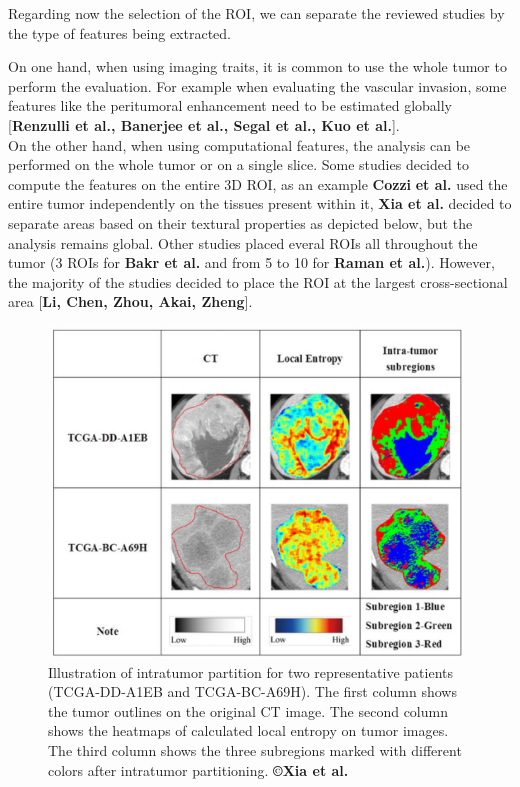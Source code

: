 \documentclass[]{article}
\begin{document}
Regarding now the selection of the ROI, we can separate the reviewed
studies by the type of features being extracted.

On one hand, when using imaging traits, it is common to use the whole
tumor to perform the evaluation. For example when evaluating the
vascular invasion, some features like the peritumoral enhancement need
to be estimated globally {[}\textbf{Renzulli et al., Banerjee et al.,
Segal et al., Kuo et al.}{]}.\\
On the other hand, when using computational features, the analysis can
be performed on the whole tumor or on a single slice. Some studies
decided to compute the features on the entire 3D ROI, as an example
\textbf{Cozzi} \textbf{et al.} used the entire tumor independently on
the tissues present within it, \textbf{Xia et al.} decided to separate
areas based on their textural properties as depicted below, but the
analysis remains global. Other studies placed everal ROIs all throughout
the tumor (3 ROIs for \textbf{Bakr et al.} and from 5 to 10 for
\textbf{Raman et al.}). However, the majority of the studies decided to
place the ROI at the largest cross-sectional area {[}\textbf{Li, Chen,
Zhou, Akai, Zheng}{]}.

\begin{figure}[ht!]
\centering
\includegraphics[width=4.34043in,height=3.46021in]{./images/image16.png}
\caption{Illustration of intratumor partition for two representative
patients (TCGA-DD-A1EB and TCGA-BC-A69H). The first column shows the
tumor outlines on the original CT image. The second column shows the
heatmaps of calculated local entropy on tumor images. The third column
shows the three subregions marked with different colors after intratumor
partitioning. \textbf{©Xia et al.} }
\end{figure}
\end{document}
